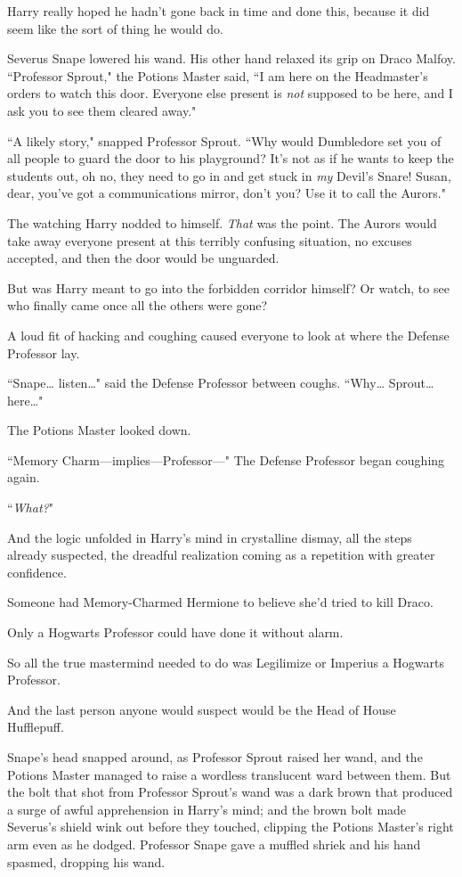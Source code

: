 Harry really hoped he hadn't gone back in time and done this, because it did seem like the sort of thing he would do.

Severus Snape lowered his wand. His other hand relaxed its grip on Draco Malfoy. ``Professor Sprout," the Potions Master said, ``I am here on the Headmaster's orders to watch this door. Everyone else present is \emph{not} supposed to be here, and I ask you to see them cleared away."

``A likely story," snapped Professor Sprout. ``Why would Dumbledore set you of all people to guard the door to his playground? It's not as if he wants to keep the students out, oh no, they need to go in and get stuck in \emph{my} Devil's Snare! Susan, dear, you've got a communications mirror, don't you? Use it to call the Aurors."

The watching Harry nodded to himself. \emph{That} was the point. The Aurors would take away everyone present at this terribly confusing situation, no excuses accepted, and then the door would be unguarded.

But was Harry meant to go into the forbidden corridor himself? Or watch, to see who finally came once all the others were gone?

A loud fit of hacking and coughing caused everyone to look at where the Defense Professor lay.

``Snape{\ldots} listen{\ldots}" said the Defense Professor between coughs. ``Why{\ldots} Sprout{\ldots} here{\ldots}"

The Potions Master looked down.

``Memory Charm—implies—Professor—" The Defense Professor began coughing again.

``\emph{What?}"

And the logic unfolded in Harry's mind in crystalline dismay, all the steps already suspected, the dreadful realization coming as a repetition with greater confidence.

Someone had Memory-Charmed Hermione to believe she'd tried to kill Draco.

Only a Hogwarts Professor could have done it without alarm.

So all the true mastermind needed to do was Legilimize or Imperius a Hogwarts Professor.

And the last person anyone would suspect would be the Head of House Hufflepuff.

Snape's head snapped around, as Professor Sprout raised her wand, and the Potions Master managed to raise a wordless translucent ward between them. But the bolt that shot from Professor Sprout's wand was a dark brown that produced a surge of awful apprehension in Harry's mind; and the brown bolt made Severus's shield wink out before they touched, clipping the Potions Master's right arm even as he dodged. Professor Snape gave a muffled shriek and his hand spasmed, dropping his wand.

